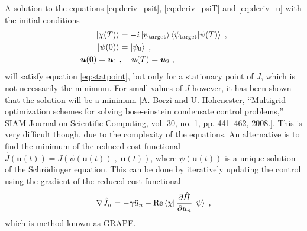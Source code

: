 A solution to the equations \ref{eq:deriv_psit}, \ref{eq:deriv_psiT} and \ref{eq:deriv_u} with the initial conditions
\begin{align}
	\ket{\chi (T)} &= -i \ket{\psi_{\mathrm{target}}} \braket{\psi_{\mathrm{target}} | \psi (T)} \; , \\
	\ket{\psi (0)} &= \ket{\psi _0} \; , \\
	\boldsymbol{u}(0) = \boldsymbol{u}_1 \; &, \quad \boldsymbol{u}(T) = \boldsymbol{u}_2 \; ,
\end{align}
will satisfy equation \ref{eq:statpoint}, but only for a stationary point of $J$, which is not necessarily the minimum. For small values of $J$ however, it has been shown that the solution will be a minimum [A. Borzì and U. Hohenester, “Multigrid optimization schemes for solving bose-einstein condensate control
problems,” SIAM Journal on Scientific Computing, vol. 30, no. 1, pp. 441–462, 2008.]. This is very difficult though, due to the complexity of the equations. An alternative is to find the minimum of the reduced cost functional $\hat{J}\left( \boldsymbol{u}(t) \right) =  J\left(\psi(\boldsymbol{u}(t)) \; , \; \boldsymbol{u}(t) \right)$, where $\psi(\boldsymbol{u}(t))$ is a unique solution of the Schrödinger equation. This can be done by iteratively updating the control using the gradient of the reduced cost functional
\begin{equation}
	\nabla \hat{J}_n = - \gamma \ddot{u}_n - \Re \bra{\chi} \pdv{\hat{H}}{u_n} \ket{\psi} \; ,
\end{equation}
which is method known as GRAPE. 